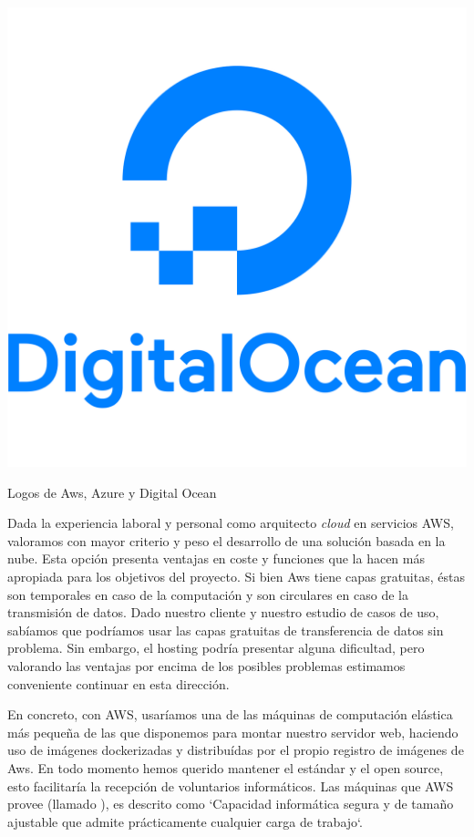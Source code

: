 \begin{table}[h]
\includegraphics[scale=0.08]{archivos/digitalocean.png}
\caption{Logos de Aws, Azure y Digital Ocean}
\end{table}
\par Dada la experiencia laboral y personal como arquitecto \emph{cloud} en servicios AWS, valoramos con mayor criterio y peso el desarrollo de una solución basada en la nube. Esta opción presenta ventajas en coste y funciones que la hacen más apropiada para los objetivos del proyecto.
Si bien Aws tiene capas gratuitas, éstas son temporales en caso de la computación y son circulares en caso de la transmisión de datos. Dado nuestro cliente y nuestro estudio de casos de uso, sabíamos que podríamos usar las capas gratuitas de transferencia de datos sin problema. Sin embargo, el hosting podría presentar alguna dificultad, pero valorando las ventajas por encima de los posibles problemas estimamos conveniente continuar en esta dirección.
\par En concreto, con AWS, usaríamos una de las máquinas de computación elástica más pequeña de las que disponemos para montar nuestro servidor web, haciendo uso de imágenes dockerizadas y distribuídas por el propio registro de imágenes de Aws. En todo momento hemos querido mantener el estándar y el open source, esto facilitaría la recepción de voluntarios informáticos. Las máquinas que AWS provee (llamado \citep{ec2AWS}), es descrito como `Capacidad informática segura y de tamaño ajustable que admite prácticamente cualquier carga de trabajo`.
